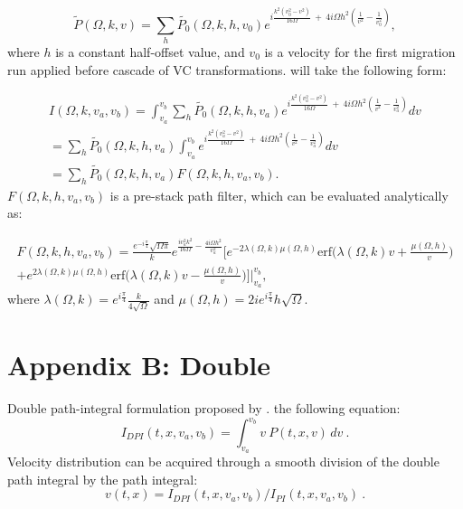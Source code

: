 \begin{equation}
\label{eq:prestack_vc}
\tilde{P}(\Omega,k,v) = \sum_{h}\tilde{P_0}(\Omega,k,h,v_0) e^{ i \frac{k^2 (v_0^2 - v^2)}{16\Omega}\ +\ 4i\Omega h^2 ( \frac{1}{v^2} - \frac{1}{v_0^2} ) },
\end{equation}
where $h$ is a constant half-offset value, and $v_0$ is a velocity for the first migration run
applied before cascade of VC transformations. 
 will take the following form:

\begin{multline}
\label{eq:prestack_pi1}
I(\Omega,k,v_a,v_b) = \int_{v_a}^{v_b} \sum_{h}\tilde{P_0}(\Omega,k,h,v_a) e^{ i \frac{k^2 (v_a^2 - v^2)}{16\Omega}\ +\ 4i\Omega h^2 ( \frac{1}{v^2} - \frac{1}{v_a^2} ) } dv\\
= \sum_{h}\tilde{P_0}(\Omega,k,h,v_a) \int_{v_a}^{v_b} e^{ i \frac{k^2 (v_a^2 - v^2)}{16\Omega}\ +\ 4i\Omega h^2 ( \frac{1}{v^2} - \frac{1}{v_a^2} ) } dv\\
= \sum_{h}\tilde{P_0}(\Omega,k,h,v_a) F(\Omega,k,h,v_a,v_b).
\end{multline}
$F(\Omega,k,h,v_a,v_b)$ is a pre-stack path filter, which can be evaluated analytically as: 

\begin{multline}
\label{eq:prestack_pi2}
F(\Omega,k,h,v_a,v_b) = \frac{e^{-i\frac{\pi}{4}}\sqrt{\Omega \pi}}{k} e^{ \frac{iv_a^2k^2}{16\Omega} - \frac{4i\Omega h^2}{v_a^2} } \bigg[ e^{-2\lambda(\Omega,k) \mu(\Omega,h)}\mbox{erf}\big(\lambda(\Omega,k)v + \frac{\mu(\Omega,h)}{v}\big)
\\+ e^{2\lambda(\Omega,k) \mu(\Omega,h)}\mbox{erf}\big(\lambda(\Omega,k)v - \frac{\mu(\Omega,h)}{v}\big) \bigg] \bigg|_{v_a}^{v_b},
\end{multline}
where $\lambda(\Omega,k) = e^{i\frac{\pi}{4}} \frac{k}{4\sqrt{\Omega}}$ and
$\mu(\Omega,h) = 2ie^{i\frac{\pi}{4}} h\sqrt{\Omega}$. 

\section{Appendix B: Double }

Double path-integral formulation  proposed by \cite{schleicher_costa09}.
 the following equation:
\begin{equation}
\label{eq:dpi}
I_{DPI}(t,x,v_a,v_b) = \int^{v_b}_{v_a} v\ P(t,x,v)\,dv\ .
\end{equation}
Velocity distribution can be acquired through a smooth division of the double path integral
by the path integral:
\begin{equation}
\label{eq:dpi_vel}
v(t,x) = I_{DPI}(t,x,v_a,v_b)/I_{PI}(t,x,v_a,v_b)\ .
\end{equation}

